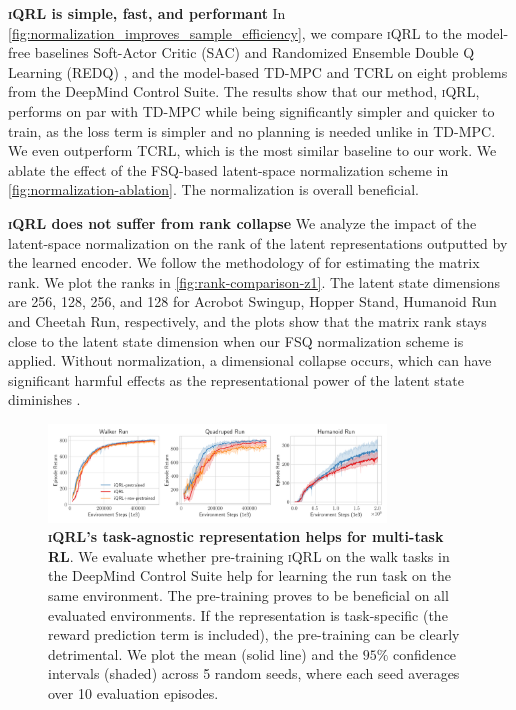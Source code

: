 \documentclass{article}
\theoremstyle{plain}
\theoremstyle{definition}
\theoremstyle{remark}
\newcommand{\our}{\textsc{iQRL}\xspace}
\begin{document}
\textbf{\our is simple, fast, and performant}
In \cref{fig:normalization_improves_sample_efficiency}, we compare \our to the model-free baselines Soft-Actor Critic (SAC) \cite{haarnojaSoft2018} and Randomized Ensemble Double Q Learning (REDQ) \cite{chenRandomizedEnsembledDouble2021}, and the model-based TD-MPC \cite{hansenTemporalDifferenceLearning2022} and TCRL \cite{zhaoSimplifiedTemporalConsistency2023} on eight problems from the DeepMind Control Suite. The results show that our method, \our, performs on par with TD-MPC while being significantly simpler and quicker to train, as the loss term is simpler and no planning is needed unlike in TD-MPC. We even outperform TCRL, which is the most similar baseline to our work. We ablate the effect of the FSQ-based latent-space normalization scheme in \cref{fig:normalization-ablation}. The normalization is overall beneficial. 

\textbf{\our does not suffer from rank collapse} We analyze the impact of the latent-space normalization on the rank of the latent representations outputted by the learned encoder. We follow the methodology of \citet{ni2024bridging} for estimating the matrix rank. We plot the ranks in \cref{fig:rank-comparison-z1}. The latent state dimensions are 256, 128, 256, and 128 for Acrobot Swingup, Hopper Stand, Humanoid Run and Cheetah Run, respectively, and the plots show that the matrix rank stays close to the latent state dimension when our FSQ normalization scheme is applied. Without normalization, a dimensional collapse occurs, which can have significant harmful effects as the representational power of the latent state diminishes \cite{jingUnderstandingDimensionalCollapse2021}.

\begin{figure}[ht]
	\vskip 0.2in
	\begin{center}
		\centerline{\includegraphics[width=0.8\textwidth]{./figs/task-agnostic-ablation.pdf}}
		\caption{\textbf{\our's task-agnostic representation helps for multi-task RL}. We evaluate whether pre-training \our on the walk tasks in the DeepMind Control Suite help for learning the run task on the same environment. The pre-training proves to be beneficial on all evaluated environments. If the representation is task-specific (the reward prediction term is included), the pre-training can be clearly detrimental. We plot the mean (solid line) and the $95\%$ confidence intervals (shaded) across 5 random seeds, where each seed averages over 10 evaluation episodes.}
		\label{fig:multi-task-pretraining}
	\end{center}
	\vskip -0.2in
\end{figure}
\end{document}
